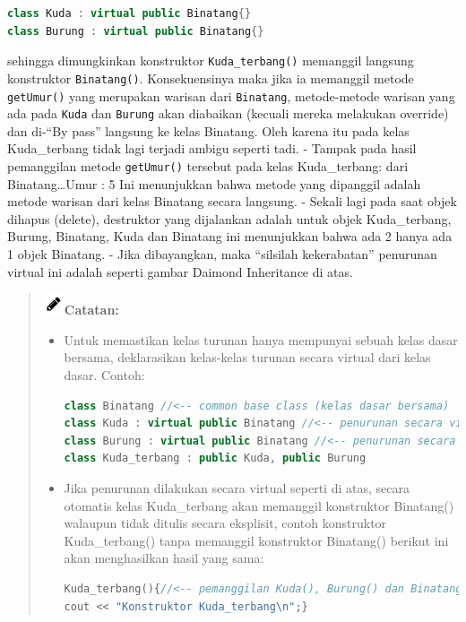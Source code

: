 \begin{lstlisting}[language=c++, numbers=none]
class Kuda : virtual public Binatang{}
class Burung : virtual public Binatang{}
\end{lstlisting}

sehingga dimungkinkan konstruktor \texttt{Kuda\_terbang()} memanggil
langsung konstruktor \texttt{Binatang()}. Konsekuensinya maka jika ia
memanggil metode \texttt{getUmur()} yang merupakan warisan dari
\texttt{Binatang}, metode-metode warisan yang ada pada \texttt{Kuda} dan
\texttt{Burung} akan diabaikan (kecuali mereka melakukan override) dan
di-``By pass'' langsung ke kelas Binatang. Oleh karena itu pada kelas
Kuda\_terbang tidak lagi terjadi ambigu seperti tadi. - Tampak pada
hasil pemanggilan metode \texttt{getUmur()} tersebut pada kelas
Kuda\_terbang: dari Binatang\ldots{}Umur : 5 Ini menunjukkan bahwa
metode yang dipanggil adalah metode warisan dari kelas Binatang secara
langsung. - Sekali lagi pada saat objek dihapus (delete), destruktor
yang dijalankan adalah untuk objek Kuda\_terbang, Burung, Binatang, Kuda
dan Binatang ini menunjukkan bahwa ada 2 hanya ada 1 objek Binatang. -
Jika dibayangkan, maka ``silsilah kekerabatan'' penurunan virtual ini
adalah seperti gambar Daimond Inheritance di atas.

\begin{quotation}
\includegraphics{../manuscript/images/pencil}\textbf{Catatan:}
	
\begin{itemize}
\item Untuk memastikan kelas turunan hanya mempunyai sebuah kelas dasar bersama,
deklarasikan kelas-kelas turunan secara virtual dari kelas dasar. Contoh:

\begin{lstlisting}[language=c++, numbers=none]
class Binatang //<-- common base class (kelas dasar bersama)
class Kuda : virtual public Binatang //<-- penurunan secara virtual
class Burung : virtual public Binatang //<-- penurunan secara virtual
class Kuda_terbang : public Kuda, public Burung
\end{lstlisting}

\item Jika penurunan dilakukan secara virtual seperti di atas, secara otomatis kelas
Kuda\_terbang akan memanggil konstruktor Binatang() walaupun tidak ditulis
secara eksplisit, contoh konstruktor Kuda\_terbang() tanpa memanggil konstruktor
Binatang() berikut ini akan menghasilkan hasil yang sama:
		
\begin{lstlisting}[language=c++, numbers=none]
Kuda_terbang(){//<-- pemanggilan Kuda(), Burung() dan Binatang() implisit
cout << "Konstruktor Kuda_terbang\n";}
\end{lstlisting}
\end{itemize}

\end{quotation}




